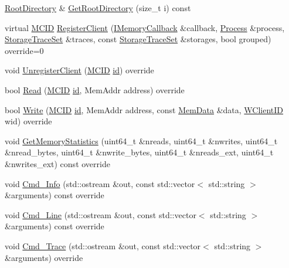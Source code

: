 \begin{DoxyCompactItemize}
\hyperlink{class_simulator_1_1_c_d_m_a_1_1_root_directory}{Root\+Directory} \& \hyperlink{class_simulator_1_1_c_d_m_a_a9258c45e62271e8f5c77fca8f9f006f4}{Get\+Root\+Directory} (size\+\_\+t i) const 
\item 
virtual \hyperlink{namespace_simulator_a4b5747ff30c62c6373badf3b53b9abf7}{M\+C\+I\+D} \hyperlink{class_simulator_1_1_c_d_m_a_aae97f6ed3411dff734ea58cb845760a5}{Register\+Client} (\hyperlink{class_simulator_1_1_i_memory_callback}{I\+Memory\+Callback} \&callback, \hyperlink{class_simulator_1_1_process}{Process} \&process, \hyperlink{class_simulator_1_1_storage_trace_set}{Storage\+Trace\+Set} \&traces, const \hyperlink{class_simulator_1_1_storage_trace_set}{Storage\+Trace\+Set} \&storages, bool grouped) override=0
\item 
void \hyperlink{class_simulator_1_1_c_d_m_a_a73a3c7e585030491fb2f54dc99913fe7}{Unregister\+Client} (\hyperlink{namespace_simulator_a4b5747ff30c62c6373badf3b53b9abf7}{M\+C\+I\+D} \hyperlink{mtconf_8c_aa3185401f04d30bd505daebf48c39cc5}{id}) override
\item 
bool \hyperlink{class_simulator_1_1_c_d_m_a_ab64a5f0667c3912f7dc5837fa7b00507}{Read} (\hyperlink{namespace_simulator_a4b5747ff30c62c6373badf3b53b9abf7}{M\+C\+I\+D} \hyperlink{mtconf_8c_aa3185401f04d30bd505daebf48c39cc5}{id}, Mem\+Addr address) override
\item 
bool \hyperlink{class_simulator_1_1_c_d_m_a_a959009cf2b4a9e3bbcf0ffb4aba8aa70}{Write} (\hyperlink{namespace_simulator_a4b5747ff30c62c6373badf3b53b9abf7}{M\+C\+I\+D} \hyperlink{mtconf_8c_aa3185401f04d30bd505daebf48c39cc5}{id}, Mem\+Addr address, const \hyperlink{struct_simulator_1_1_mem_data}{Mem\+Data} \&data, \hyperlink{namespace_simulator_a0de605c35951a450d074222efcef6359}{W\+Client\+I\+D} wid) override
\item 
void \hyperlink{class_simulator_1_1_c_d_m_a_a43e2b656101524ec25a3e3767fcbb3af}{Get\+Memory\+Statistics} (uint64\+\_\+t \&nreads, uint64\+\_\+t \&nwrites, uint64\+\_\+t \&nread\+\_\+bytes, uint64\+\_\+t \&nwrite\+\_\+bytes, uint64\+\_\+t \&nreads\+\_\+ext, uint64\+\_\+t \&nwrites\+\_\+ext) const override
\item 
void \hyperlink{class_simulator_1_1_c_d_m_a_a676f04b8147df2ec6f0b626d9654ebe9}{Cmd\+\_\+\+Info} (std\+::ostream \&out, const std\+::vector$<$ std\+::string $>$ \&arguments) const override
\item 
void \hyperlink{class_simulator_1_1_c_d_m_a_af366013154ef8c74052b5031126364b4}{Cmd\+\_\+\+Line} (std\+::ostream \&out, const std\+::vector$<$ std\+::string $>$ \&arguments) const override
\item 
void \hyperlink{class_simulator_1_1_c_d_m_a_abd272dfa995614dbf800d43308d0ff06}{Cmd\+\_\+\+Trace} (std\+::ostream \&out, const std\+::vector$<$ std\+::string $>$ \&arguments) override
\end{DoxyCompactItemize}
